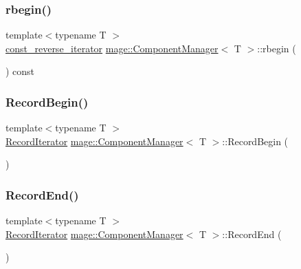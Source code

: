 \subsubsection{\texorpdfstring{rbegin()}{rbegin()}\hspace{0.1cm}{\footnotesize\ttfamily [2/2]}}
{\footnotesize\ttfamily template$<$typename T $>$ \\
\mbox{\hyperlink{classmage_1_1_component_manager_a00481d8beab5d950124f54c0f832da53}{const\+\_\+reverse\+\_\+iterator}} \mbox{\hyperlink{classmage_1_1_component_manager}{mage\+::\+Component\+Manager}}$<$ T $>$\+::rbegin (\begin{DoxyParamCaption}{ }\end{DoxyParamCaption}) const\hspace{0.3cm}{\ttfamily [noexcept]}}

\mbox{\label{classmage_1_1_component_manager_ab50ab10c4703a90ebbd653f8876936c4}} 
\subsubsection{\texorpdfstring{Record\+Begin()}{RecordBegin()}}
{\footnotesize\ttfamily template$<$typename T $>$ \\
\mbox{\hyperlink{classmage_1_1_component_manager_1_1_record_iterator}{Record\+Iterator}} \mbox{\hyperlink{classmage_1_1_component_manager}{mage\+::\+Component\+Manager}}$<$ T $>$\+::Record\+Begin (\begin{DoxyParamCaption}{ }\end{DoxyParamCaption})\hspace{0.3cm}{\ttfamily [noexcept]}}

\mbox{\label{classmage_1_1_component_manager_a38663bbf86d4ed1c364612af82cc0880}} 
\subsubsection{\texorpdfstring{Record\+End()}{RecordEnd()}}
{\footnotesize\ttfamily template$<$typename T $>$ \\
\mbox{\hyperlink{classmage_1_1_component_manager_1_1_record_iterator}{Record\+Iterator}} \mbox{\hyperlink{classmage_1_1_component_manager}{mage\+::\+Component\+Manager}}$<$ T $>$\+::Record\+End (\begin{DoxyParamCaption}{ }\end{DoxyParamCaption})\hspace{0.3cm}{\ttfamily [noexcept]}}

